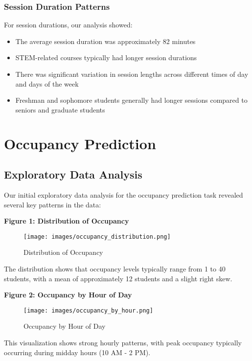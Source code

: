 \documentclass[12pt,letterpaper]{article}
\begin{document}
\subsubsection{Session Duration Patterns}

For session durations, our analysis showed:
\begin{itemize}
    \item The average session duration was approximately 82 minutes
    \item STEM-related courses typically had longer session durations
    \item There was significant variation in session lengths across different times of day and days of the week
    \item Freshman and sophomore students generally had longer sessions compared to seniors and graduate students
\end{itemize}

\section{Occupancy Prediction}

\subsection{Exploratory Data Analysis}

Our initial exploratory data analysis for the occupancy prediction task revealed several key patterns in the data:

\textbf{Figure 1: Distribution of Occupancy}

\begin{figure}[H]
    \centering
    \texttt{[image: images/occupancy\_distribution.png]}
    \caption{Distribution of Occupancy}
\end{figure}

The distribution shows that occupancy levels typically range from 1 to 40 students, with a mean of approximately 12 students and a slight right skew.

\textbf{Figure 2: Occupancy by Hour of Day}

\begin{figure}[H]
    \centering
    \texttt{[image: images/occupancy\_by\_hour.png]}
    \caption{Occupancy by Hour of Day}
\end{figure}

This visualization shows strong hourly patterns, with peak occupancy typically occurring during midday hours (10 AM - 2 PM).
\end{document}
